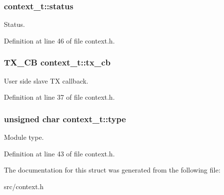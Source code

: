 \hypertarget{structcontext__t_a0e49b82a79be5df63399ddbcc0cc022c}{
\subsubsection[{status}]{ context\-\_\-t\-::status}}\label{structcontext__t_a0e49b82a79be5df63399ddbcc0cc022c}
Status. 

Definition at line 46 of file context.\-h.

\hypertarget{structcontext__t_a06d2b435c29a01be998e6383fec2ef50}{
\subsubsection[{tx\-\_\-cb}]{\setlength{\rightskip}{0pt plus 5cm}T\-X\-\_\-\-C\-B context\-\_\-t\-::tx\-\_\-cb}}\label{structcontext__t_a06d2b435c29a01be998e6383fec2ef50}
User side slave T\-X callback. 

Definition at line 37 of file context.\-h.

\hypertarget{structcontext__t_a2dbb966924ef90bfba1876ad8a3872af}{
\subsubsection[{type}]{\setlength{\rightskip}{0pt plus 5cm}unsigned char context\-\_\-t\-::type}}\label{structcontext__t_a2dbb966924ef90bfba1876ad8a3872af}
Module type. 

Definition at line 43 of file context.\-h.



The documentation for this struct was generated from the following file\-:\begin{DoxyCompactItemize}
\item 
src/context.\-h\end{DoxyCompactItemize}
